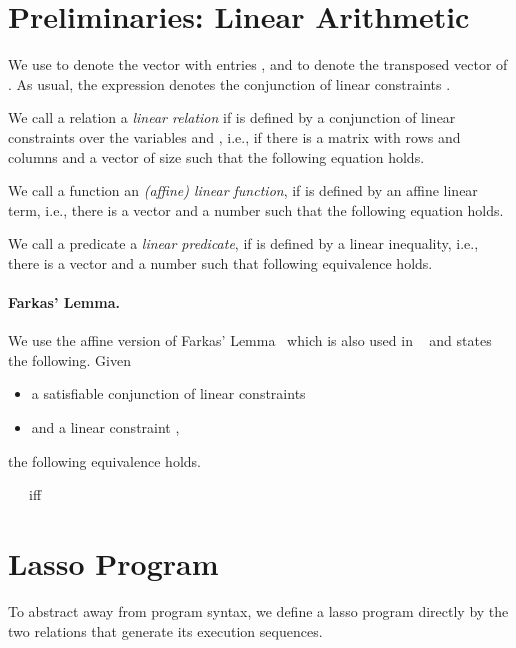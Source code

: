 \documentclass[a4paper]{llncs}
\newcommand{\defo}[1]{\emph{#1}}
\begin{document}
\section{Preliminaries: Linear Arithmetic}
We use  to denote the vector with entries , and  to denote the transposed vector of .
As usual, the expression  denotes the conjunction of linear constraints .

We call a relation  a \defo{linear relation} if  is defined by a conjunction of linear constraints over the variables  and , i.e., if there is a matrix  with  rows and  columns and a vector  of size  such that the following equation holds.


We call a function  an \defo{(affine) linear function}, if  is defined by an affine linear term, i.e., there is a vector  and a number  such that the following equation holds.


We call a predicate  a \defo{linear predicate}, if  is defined by a linear inequality, i.e., there is a vector  and a number  such that following equivalence holds.



\paragraph{Farkas' Lemma.} We use the affine version of Farkas' Lemma~\cite{Schrijver:1986:TLI:17634} which is also used in ~\cite{DBLP:journals/iandc/BagnaraMPZ12,cav/BradleyMS05,journals/fmsd/CookKRW13,cav/Rybalchenko10,vmcai/PodelskiR04} and states the following.
Given
\begin{itemize}
 \item a satisfiable conjunction of linear constraints 
 \item and a linear constraint ,
\end{itemize}
the following equivalence holds.
\begin{center}
 \ \ \ iff \ \ \  
\end{center}












\section{Lasso Program}
To abstract away from program syntax, we define a lasso program directly by the two relations that generate its execution sequences.
\end{document}
